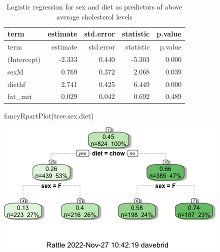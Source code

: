 \documentclass[
]{article}
\newenvironment{Shaded}{\begin{snugshade}}{\end{snugshade}}
\newcommand{\FunctionTok}[1]{\textcolor[rgb]{0.00,0.00,0.00}{#1}}
\newcommand{\NormalTok}[1]{#1}
\begin{document}
\begin{longtable}[]{@{}lrrrr@{}}
\caption{Logistic regression for sex and diet as predictors of above
average cholesterol levels}\tabularnewline
\toprule()
term & estimate & std.error & statistic & p.value \\
\midrule()
\endfirsthead
\toprule()
term & estimate & std.error & statistic & p.value \\
\midrule()
\endhead
(Intercept) & -2.333 & 0.440 & -5.303 & 0.000 \\
sexM & 0.769 & 0.372 & 2.068 & 0.039 \\
diethf & 2.741 & 0.425 & 6.449 & 0.000 \\
fat\_mri & 0.029 & 0.042 & 0.692 & 0.489 \\
\bottomrule()
\end{longtable}

\begin{Shaded}
\begin{Highlighting}[]
\FunctionTok{fancyRpartPlot}\NormalTok{(tree.sex.diet)}
\end{Highlighting}
\end{Shaded}

\includegraphics{figures/fat-tree-1.png}
\end{document}
